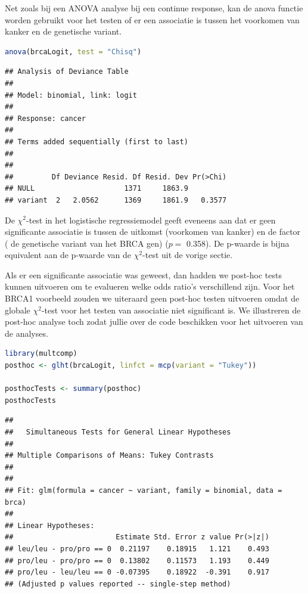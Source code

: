 \documentclass[
  12pt,dutch,coursenotes]{book}
\theoremstyle{definition}
\theoremstyle{definition}
\theoremstyle{definition}
\theoremstyle{definition}
\theoremstyle{remark}
\begin{document}
Net zoals bij een ANOVA analyse bij een continue response, kan de anova functie worden gebruikt voor het testen of er een associatie is tussen het voorkomen van kanker en de genetische variant.

\begin{lstlisting}[language=R]
anova(brcaLogit, test = "Chisq")
\end{lstlisting}

\begin{lstlisting}
## Analysis of Deviance Table
## 
## Model: binomial, link: logit
## 
## Response: cancer
## 
## Terms added sequentially (first to last)
## 
## 
##         Df Deviance Resid. Df Resid. Dev Pr(>Chi)
## NULL                     1371     1863.9         
## variant  2   2.0562      1369     1861.9   0.3577
\end{lstlisting}

De \(\chi^2\)-test in het logistische regressiemodel geeft eveneens aan dat er geen significante associatie is tussen de uitkomst (voorkomen van kanker) en de factor ( de genetische variant van het BRCA gen) (\(p=\) 0.358).
De p-waarde is bijna equivalent aan de p-waarde van de \(\chi^2\)-test uit de vorige sectie.

Als er een significante associatie was geweest, dan hadden we post-hoc tests kunnen uitvoeren om te evalueren welke odds ratio's verschillend zijn.
Voor het BRCA1 voorbeeld zouden we uiteraard geen post-hoc testen uitvoeren omdat de globale \(\chi^2\)-test voor het testen van associatie niet significant is.
We illustreren de post-hoc analyse toch zodat jullie over de code beschikken voor het uitvoeren van de analyses.

\begin{lstlisting}[language=R]
library(multcomp)
posthoc <- glht(brcaLogit, linfct = mcp(variant = "Tukey"))

posthocTests <- summary(posthoc)
posthocTests
\end{lstlisting}

\begin{lstlisting}
## 
##   Simultaneous Tests for General Linear Hypotheses
## 
## Multiple Comparisons of Means: Tukey Contrasts
## 
## 
## Fit: glm(formula = cancer ~ variant, family = binomial, data = brca)
## 
## Linear Hypotheses:
##                        Estimate Std. Error z value Pr(>|z|)
## leu/leu - pro/pro == 0  0.21197    0.18915   1.121    0.493
## pro/leu - pro/pro == 0  0.13802    0.11573   1.193    0.449
## pro/leu - leu/leu == 0 -0.07395    0.18922  -0.391    0.917
## (Adjusted p values reported -- single-step method)
\end{lstlisting}
\end{document}
